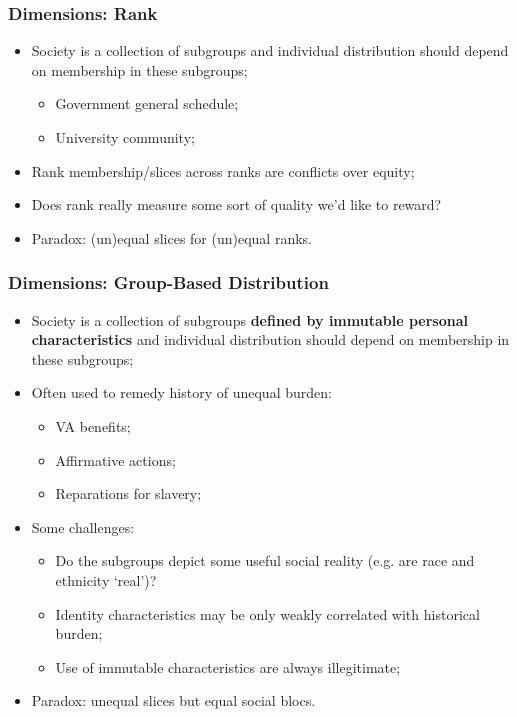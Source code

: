 \documentclass[aspectratio=169]{beamer}
\theoremstyle{principle}
\begin{document}
\begin{frame}
\frametitle{Dimensions: Rank}

\begin{itemize}
\item Society is a collection of subgroups and individual distribution should depend on membership in these subgroups;
\begin{itemize}
\item Government general schedule;
\item University community;
\end{itemize}
\bigskip
\bigskip
\item Rank membership/slices across ranks are conflicts over equity;
\bigskip
\bigskip
\item Does rank really measure some sort of quality we'd like to reward?
\bigskip
\bigskip
\item Paradox: (un)equal slices for (un)equal ranks.
\end{itemize}

\end{frame}

\begin{frame}
\frametitle{Dimensions: Group-Based Distribution}

\begin{itemize}
\item Society is a collection of subgroups \textbf{defined by immutable personal characteristics} and individual distribution should depend on membership in these subgroups;
\bigskip
\bigskip
\item Often used to remedy history of unequal burden:
\begin{itemize}
\item VA benefits;
\item Affirmative actions;
\item Reparations for slavery;
\end{itemize}
\bigskip
\bigskip
\item Some challenges:
\begin{itemize}
\item Do the subgroups depict some useful social reality (e.g. are race and ethnicity `real')?
\item Identity characteristics may be only weakly correlated with historical burden;
\item Use of immutable characteristics are always illegitimate;
\end{itemize}
\bigskip
\bigskip
\item Paradox: unequal slices but equal social blocs.
\end{itemize}

\end{frame}
\end{document}
